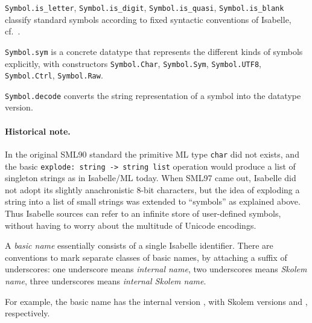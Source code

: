 \begin{isabellebody}
\begin{isamarkuptext}
\begin{description}
  \item \verb|Symbol.is_letter|, \verb|Symbol.is_digit|, \verb|Symbol.is_quasi|, \verb|Symbol.is_blank| classify standard
  symbols according to fixed syntactic conventions of Isabelle, cf.\
  \cite{isabelle-isar-ref}.

  \item \verb|Symbol.sym| is a concrete datatype that represents
  the different kinds of symbols explicitly, with constructors \verb|Symbol.Char|, \verb|Symbol.Sym|, \verb|Symbol.UTF8|, \verb|Symbol.Ctrl|, \verb|Symbol.Raw|.

  \item \verb|Symbol.decode| converts the string representation of a
  symbol into the datatype version.

  \end{description}

  \paragraph{Historical note.} In the original SML90 standard the
  primitive ML type \verb|char| did not exists, and the basic \verb|explode: string -> string list| operation would produce a list of
  singleton strings as in Isabelle/ML today.  When SML97 came out,
  Isabelle did not adopt its slightly anachronistic 8-bit characters,
  but the idea of exploding a string into a list of small strings was
  extended to ``symbols'' as explained above.  Thus Isabelle sources
  can refer to an infinite store of user-defined symbols, without
  having to worry about the multitude of Unicode encodings.%
\end{isamarkuptext}%
\isamarkuptrue%
%
\endisatagmlref
{\isafoldmlref}%
%
\isadelimmlref
%
\endisadelimmlref
%
\isamarkuptrue%
%
\begin{isamarkuptext}%
A \emph{basic name} essentially consists of a single Isabelle
  identifier.  There are conventions to mark separate classes of basic
  names, by attaching a suffix of underscores: one underscore means
  \emph{internal name}, two underscores means \emph{Skolem name},
  three underscores means \emph{internal Skolem name}.

  For example, the basic name  has the internal version
  \isa{foo{\isacharunderscore}}, with Skolem versions  and , respectively.


\end{isamarkuptext}
\end{isabellebody}
